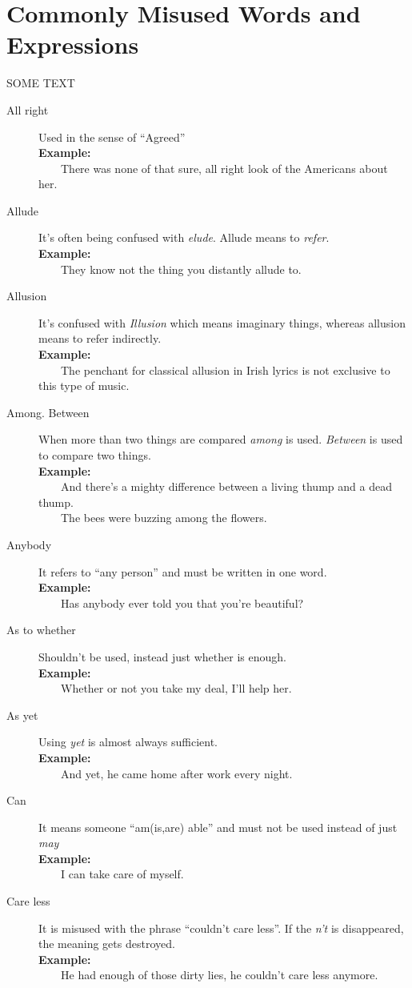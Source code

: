 \documentclass[12pt]{report}
\newcommand{\xmpl}{\textbf{Example:}\\} %
\newcommand{\indnt}{\ \ \ \ } %
\begin{document}
\chapter{Commonly Misused Words and Expressions}
SOME TEXT
\begin{description}
	\item[All right] Used in the sense of ``Agreed''\\
	\xmpl
	\indnt There was none of that sure, all right look of the Americans about her.
	\item[Allude] It's often being confused with \textit{elude}. Allude means to \textit{refer}.\\
	\xmpl
	\indnt They know not the thing you distantly allude to.
	\item[Allusion] It's confused with \textit{Illusion} which means imaginary things, whereas allusion means to refer indirectly.\\
	\xmpl
	\indnt The penchant for classical allusion in Irish lyrics is not exclusive to this type of music. 
	\item[Among. Between] When more than two things are compared \textit{among} is used. \emph{Between} is used to compare two things.\\
	\xmpl
	\indnt And there's a mighty difference between a living thump and a dead thump.\\
	\indnt The bees were buzzing among the flowers.
	\item[Anybody] It refers to ``any person'' and must be written in one word.\\
	\xmpl
	\indnt Has anybody ever told you that you're beautiful?
	\item[As to whether] Shouldn't be used, instead just whether is enough.\\
	\xmpl
	\indnt Whether or not you take my deal, I'll help her.
	\item[As yet] Using \textit{yet} is almost always sufficient.\\
	\xmpl
	\indnt And yet, he came home after work every night.
	\item[Can] It means someone ``am(is,are) able'' and must not be used instead of just \textit{may}\\
	\xmpl
	\indnt I can take care of myself.
	\item[Care less] It is misused with the phrase ``couldn't care less''. If the \textit{n't} is disappeared, the meaning gets destroyed.\\
	\xmpl
	\indnt He had enough of those dirty lies, he couldn't care less anymore.

\end{description}
\end{document}
